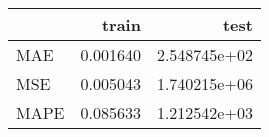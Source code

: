 \begin{tabular}{lrr}
\toprule
{} &     train &          test \\
\midrule
MAE  &  0.001640 &  2.548745e+02 \\
MSE  &  0.005043 &  1.740215e+06 \\
MAPE &  0.085633 &  1.212542e+03 \\
\bottomrule
\end{tabular}
